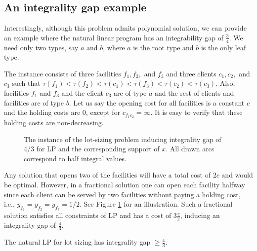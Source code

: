 \subsection{An integrality gap example}

Interestingly, although this problem admits polynomial solution, we can provide an example where the natural linear program has an integrability gap of $\frac{3}{4}$. We need only two types, say $a$ and $b$, where $a$ is the root type and $b$ is the only leaf type.

The instance consists of three facilities $f_1, f_2,$ and $f_3$ and three clients $c_1, c_2,$ and $c_3$ such that $\tau(f_1) < \tau(f_2) < \tau(c_1) < \tau(f_3) < \tau(c_2) < \tau(c_3)$. Also, facilities $f_1$ and $f_3$ and the client $c_3$ are of type $a$ and the rest of clients and facilities are of type $b$. Let us say the opening cost for all facilities is a constant $c$ and the holding costs are $0$, except for $c_{f_1c_2} = \infty$. It is easy to verify that these holding costs are non-decreasing.

\begin{figure}
\centering
{}

\caption{The instance of the lot-sizing problem inducing integrality gap of $4/3$ for LP and the corresponding support of $x$. All drawn arcs correspond to half integral values.}
\label{fig:IGlotsizing}
\end{figure}

Any solution that opens two of the facilities will have a total cost of $2c$ and would be optimal. However, in a fractional solution one can open each facility halfway since each client can be served by two facilities without paying a holding cost, i.e., $y_{f_1} = y_{f_2} = y_{f_3} = 1/2$. See Figure \ref{fig:IGlotsizing} for an illustration. Such a fractional solution satisfies all constraints of LP and has a cost of $3 \frac{c}{2}$, inducing an integrality gap of $\frac{4}{3}$.

\begin{thm}
The natural LP for lot sizing has integrality gap $\ge \frac{4}{3}$.
\end{thm}
